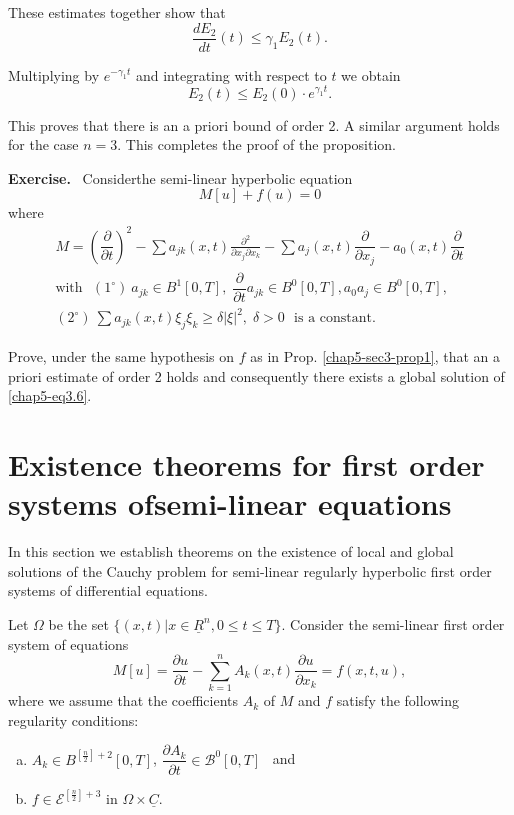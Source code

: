 These estimates together show that 
$$
\dfrac{dE_2}{dt}(t) \leq \gamma_1 E_2 (t).  
$$

Multiplying by $e^{-\gamma_1t}$ and integrating with respect to $t$ we
obtain  
\begin{equation*} 
E_2 (t) \leq E_2 (0) \cdot e^{\gamma_{1}t}. \tag{3.5}\label{chap5-eq3.5}
\end{equation*}

This proves that there is an a priori bound of order 2. A similar
argument holds for the case $n=3$. This completes the proof of the
proposition.  

\medskip
\noindent
\textbf{Exercise.}~ Consider\pageoriginale the semi-linear hyperbolic
equation  
\begin{equation*}
M[u] + f(u) = 0 \tag{3.6}\label{chap5-eq3.6}
\end{equation*}
where 
\begin{gather*}
M = \left(\dfrac{\partial}{\partial t}\right)^2 - \sum a_{jk}(x, t)
\frac{\partial^2}{\partial x_j \partial x_k} - \sum a_j (x,
t)\dfrac{\partial}{\partial x_j} - a_0 (x, t)
\dfrac{\partial}{\partial t}\\ 
\text{with~ } (1^\circ)~ a_{jk} \in B^1 [0, T],
\; \dfrac{\partial}{\partial t} a_{jk} \in B^0 [0, T], a_{0} a_j
\in B^0 [0, T],\\ 
 (2^\circ)~ \sum a_{jk} (x, t) \xi_j \xi_k \geq \delta |\xi |^2, \; \delta > 0
\text{~ is a constant.}  
\end{gather*}

Prove, under the same hypothesis on $f$ as in
Prop. \ref{chap5-sec3-prop1}, that an a 
priori estimate of order 2 holds and consequently there exists a
global solution of \eqref{chap5-eq3.6}.  

\section[Existence theorems for first order systems of.....]{Existence theorems for first order systems of\hfill\break semi-linear
  equations}\label{chap5-sec4} %

In this section we establish theorems on the existence of local and
global solutions of the Cauchy problem for semi-linear regularly
hyperbolic first order systems of differential equations.  

Let $\Omega$ be the set $\{ (x, t) | x \in \underline{R}^n, 0
\leq t \leq  T \}$. Consider the semi-linear first order system of
equations  
\begin{equation*}
M[u] = \frac{\partial u}{ \partial t} - \sum^n_{k = 1} A_k (x, t)
\frac{\partial u}{ \partial x_k} = f(x, t, u), \tag{4.1}\label{chap5-eq4.1} 
\end{equation*}
where we assume that the coefficients $A_k$ of $M$ and $f$ satisfy the
following regularity conditions:  
\begin{enumerate}[(a)]
\item $A_k \in B^{[\frac{n}{2}] +2} [0, T]$, $\dfrac{\partial
  A_k}{\partial t} \in \mathscr{B}^0 [0, T]$~ and  

\item $f \in \mathscr{E}^{[\frac{n}{2}]+3}$ in $\Omega \times
  \underline{C}$.  
\end{enumerate}

